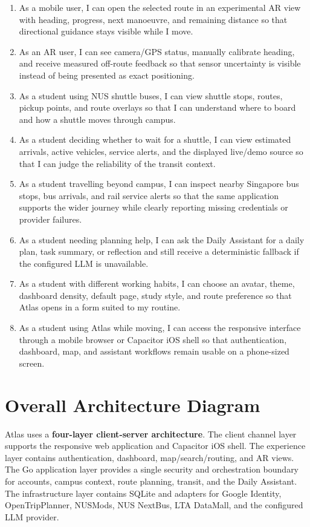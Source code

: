 \documentclass[11pt]{article}
\begin{document}
\begin{enumerate}[leftmargin=*]
    \item As a mobile user, I can open the selected route in an experimental AR view with heading, progress, next manoeuvre, and remaining distance so that directional guidance stays visible while I move.
    \item As an AR user, I can see camera/GPS status, manually calibrate heading, and receive measured off-route feedback so that sensor uncertainty is visible instead of being presented as exact positioning.
    \item As a student using NUS shuttle buses, I can view shuttle stops, routes, pickup points, and route overlays so that I can understand where to board and how a shuttle moves through campus.
    \item As a student deciding whether to wait for a shuttle, I can view estimated arrivals, active vehicles, service alerts, and the displayed live/demo source so that I can judge the reliability of the transit context.
    \item As a student travelling beyond campus, I can inspect nearby Singapore bus stops, bus arrivals, and rail service alerts so that the same application supports the wider journey while clearly reporting missing credentials or provider failures.
    \item As a student needing planning help, I can ask the Daily Assistant for a daily plan, task summary, or reflection and still receive a deterministic fallback if the configured LLM is unavailable.
    \item As a student with different working habits, I can choose an avatar, theme, dashboard density, default page, study style, and route preference so that Atlas opens in a form suited to my routine.
    \item As a student using Atlas while moving, I can access the responsive interface through a mobile browser or Capacitor iOS shell so that authentication, dashboard, map, and assistant workflows remain usable on a phone-sized screen.
\end{enumerate}

\newpage

\section*{Overall Architecture Diagram}

Atlas uses a \textbf{four-layer client-server architecture}. The client channel layer supports the responsive web application and Capacitor iOS shell. The experience layer contains authentication, dashboard, map/search/routing, and AR views. The Go application layer provides a single security and orchestration boundary for accounts, campus context, route planning, transit, and the Daily Assistant. The infrastructure layer contains SQLite and adapters for Google Identity, OpenTripPlanner, NUSMods, NUS NextBus, LTA DataMall, and the configured LLM provider.
\end{document}
